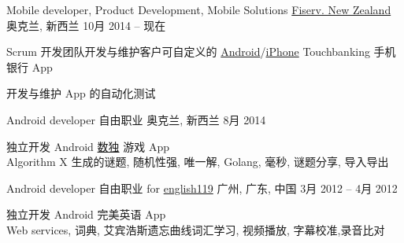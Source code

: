 
\begin{cventries}
	\cventry
	{Mobile developer, Product Development, Mobile Solutions}
	{\href{https://www.careers.fiserv.com/new-zealand}{Fiserv. New Zealand}}
	{奥克兰, \enskip 新西兰}
	{10月 2014 – 现在}
	{
		\begin{cvitems}
			\item {Scrum 开发团队开发与维护客户可自定义的 \href{https://play.google.com/store/apps/details?id=com.fiserv.touchbankingasp&hl=en}{Android}/\href{https://itunes.apple.com/us/app/touchbanking/id386678211?mt=8}{iPhone} Touchbanking 手机银行 App}
			\item {开发与维护 App 的自动化测试}
		\end{cvitems}
	}
\end{cventries}

\begin{cventries}
	\cventry
	{Android developer}
	{自由职业}
	{奥克兰, \enskip 新西兰}
	{8月 2014}
	{
		\begin{cvitems}
			\item {独立开发 Android \href{https://play.google.com/store/apps/details?id=com.gmail.jiangyang5157.sudoku}{数独} 游戏 App\\
			Algorithm X 生成的谜题, 随机性强, 唯一解, Golang, 毫秒, 谜题分享, 导入导出}
		\end{cvitems}
	}
\end{cventries}

\begin{cventries}
	\cventry
	{Android developer}
	{自由职业 for \href{http://www.english119.cn}{english119}}
	{广州, \enskip 广东, \enskip 中国}
	{3月 2012 – 4月 2012}
	{
		\begin{cvitems}
			\item {独立开发 Android 完美英语 App\\
				Web services, 词典, 艾宾浩斯遗忘曲线词汇学习, 视频播放, 字幕校准,录音比对}
		\end{cvitems}
	}
\end{cventries}

